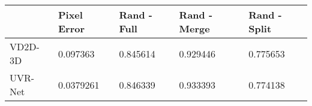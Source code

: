 \begin{tabular}{lllll}
\toprule
{} & Pixel Error & Rand - Full & Rand - Merge & Rand - Split \\
\midrule
VD2D-3D &    0.097363 &    0.845614 &     0.929446 &     0.775653 \\
UVR-Net &   0.0379261 &    0.846339 &     0.933393 &     0.774138 \\
\bottomrule
\end{tabular}
